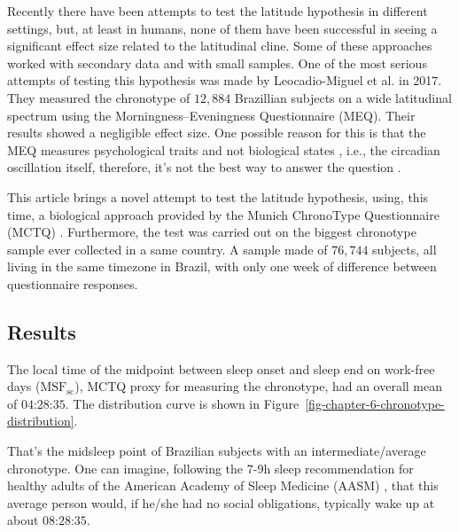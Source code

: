 \documentclass[
12pt,
openright,
oneside,
a4paper,
chapter=TITLE,
section=TITLE,
french,
spanish,
brazil,
english
]{abntex2}\usepackage{array}
\begin{document}
Recently there have been attempts to test the latitude hypothesis in
different settings, but, at least in humans, none of them have been
successful in seeing a significant effect size related to the
latitudinal cline. Some of these approaches worked with secondary data
and with small samples. One of the most serious attempts of testing this
hypothesis was made by Leocadio-Miguel et al.
\autocite*{leocadio-miguel2017} in 2017. They measured the chronotype of
\(12,884\) Brazillian subjects on a wide latitudinal spectrum using the
Morningness--Eveningness Questionnaire (MEQ). Their results showed a
negligible effect size. One possible reason for this is that the MEQ
measures psychological traits and not biological states
\autocite{roenneberg2019}, i.e., the circadian oscillation itself,
therefore, it's not the best way to answer the question
\autocite{leocadio-miguel2014}.

This article brings a novel attempt to test the latitude hypothesis,
using, this time, a biological approach provided by the Munich
ChronoType Questionnaire (MCTQ) \autocite{roenneberg2003}. Furthermore,
the test was carried out on the biggest chronotype sample ever collected
in a same country. A sample made of \(76,744\) subjects, all living in
the same timezone in Brazil, with only one week of difference between
questionnaire responses.

\subsection{Results}\label{results}

The local time of the midpoint between sleep onset and sleep end on
work-free days (\(\text{MSF}_{\text{sc}}\)), MCTQ proxy for measuring
the chronotype, had an overall mean of \(\text{04:28:35}\). The
distribution curve is shown in
Figure~\ref{fig-chapter-6-chronotype-distribution}.

That's the midsleep point of Brazilian subjects with an
intermediate/average chronotype. One can imagine, following the 7-9h
sleep recommendation for healthy adults of the American Academy of Sleep
Medicine (AASM) \autocite{watson2015}, that this average person would,
if he/she had no social obligations, typically wake up at about
\(\text{08:28:35}\).
\end{document}
